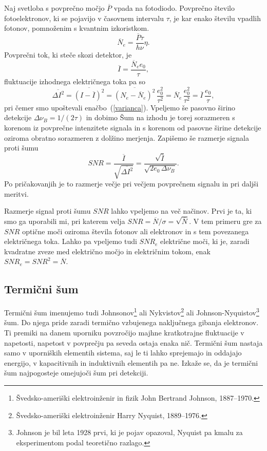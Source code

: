 Naj svetloba s povprečno močjo $\overline{P}$ vpada na fotodiodo.
Povprečno število fotoelektronov, ki se pojavijo v časovnem intervalu 
$\tau$, je kar enako številu vpadlih fotonov, pomnoženim 
s kvantnim izkoristkom. 
\begin{equation}
\overline{N}_e = \frac{\overline{P}\tau}{h \nu}\eta.
\end{equation}
Povprečni tok, ki steče skozi detektor, je  
\begin{equation}
\overline{I} = \frac{\overline{N}_e e_0}{\tau},
\end{equation}
fluktuacije izhodnega električnega toka pa so
\begin{equation}
\overline{\Delta I^2}=\overline{(I-\overline{I})^2} = \overline{(N_e-\overline{N}_e)^2}\,
\frac{e_0^2}{\tau^2} = \overline{N}_e\,\frac{e_0^2}{\tau^2}= \overline{I}\,\frac{e_0}{\tau},
\end{equation}
pri čemer smo upoštevali enačbo~(\ref{varianca}). Vpeljemo še pasovno širino 
detekcije $\Delta\nu_B = 1/(2\tau)$ in dobimo
Šum na izhodu je torej sorazmeren s korenom iz povprečne intenzitete signala in 
s korenom od pasovne širine detekcije oziroma obratno sorazmeren z dolžino 
merjenja. Zapišemo še razmerje signala proti šumu 
\begin{equation}
SNR = \frac{\overline{I}}{\sqrt{\overline{\Delta I^2}}}= \frac{\sqrt{\overline{I}}}
{\sqrt{2 e_0\, \Delta\nu_B}}.
\label{SNRs}
\end{equation}
Po pričakovanjih je to razmerje večje pri večjem povprečnem signalu in pri daljši meritvi.

\begin{remark}
Razmerje signal proti šumu $SNR$ lahko vpeljemo na več načinov. Prvi je ta, ki smo ga 
uporabili mi, pri katerem velja $SNR = \overline{N}/\sigma = \sqrt{\overline{N}}$. 
V tem primeru gre za $SNR$ optične moči oziroma števila fotonov ali elektronov in s 
tem povezanega električnega toka. Lahko pa vpeljemo tudi $SNR_e$ električne moči, ki je, 
zaradi kvadratne zveze med električno močjo in električnim tokom, enak $SNR_e=SNR^2=\overline{N}$.
\end{remark}

\subsection*{Termični šum} 
Termični šum imenujemo tudi Johnsonov\footnote{Švedsko-ameriški elektroinženir in fizik 
John Bertrand Johnson, 1887--1970.} ali Nykvistov\footnote{Švedsko-ameriški elektroinženir
Harry Nyquist, 1889--1976.} ali Johnson-Nyquistov\footnote{Johnson je bil leta 1928 prvi, 
ki je pojav opazoval, Nyquist pa kmalu za eksperimentom podal teoretično razlago.} šum. 
Do njega pride zaradi termično vzbujenega naključnega gibanja elektronov. Ti premiki
na danem uporniku povzročijo majhne kratkotrajne fluktuacije v napetosti, napetost
v povprečju pa seveda ostaja enaka nič.  
Termični šum nastaja samo v uporniških elementih sistema, saj le ti lahko
sprejemajo in oddajajo energijo, v kapacitivnih in induktivnih elementih pa ne.
Izkaže se, da je termični šum najpogosteje omejujoči šum pri detekciji.

